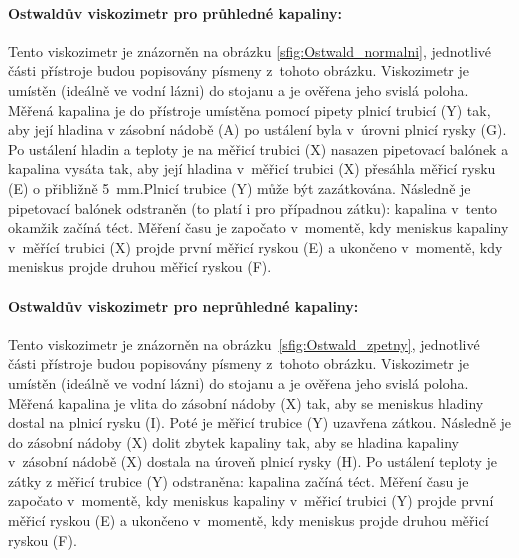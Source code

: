 \documentclass[12pt]{article}
\begin{document}
\paragraph{Ostwaldův viskozimetr pro průhledné kapaliny:}
Tento viskozimetr je znázorněn na obrázku \ref{sfig:Ostwald_normalni}, jednotlivé části přístroje budou popisovány písmeny z~tohoto obrázku. Viskozimetr je umístěn (ideálně ve vodní lázni) do stojanu a je ověřena jeho svislá poloha. Měřená kapalina je do přístroje umístěna pomocí pipety plnicí trubicí (Y) tak, aby její hladina v zásobní nádobě (A) po ustálení byla v~úrovni plnicí rysky (G). Po ustálení hladin a teploty je na měřicí trubici (X) nasazen pipetovací balónek a kapalina vysáta tak, aby její hladina v~měřicí trubici (X) přesáhla měřicí rysku (E) o přibližně \SI{5}{\milli\metre}.\footnotemark Plnicí trubice (Y) může být zazátkována. Následně je pipetovací balónek odstraněn (to platí i pro případnou zátku): kapalina v~tento okamžik začíná téct. Měření času je započato v~momentě, kdy meniskus kapaliny v~měřící trubici (X) projde první měřicí ryskou (E) a ukončeno v~momentě, kdy meniskus projde druhou měřicí ryskou (F).~\cite{book:Calibration_of_viscometers}

\paragraph{Ostwaldův viskozimetr pro neprůhledné kapaliny:}
\label{sec:zpetny_ostwald}
Tento viskozimetr je znázorněn na obrázku~\ref{sfig:Ostwald_zpetny}, jednotlivé části přístroje budou popisovány písmeny z~tohoto obrázku. Viskozimetr je umístěn (ideálně ve vodní lázni) do stojanu a je ověřena jeho svislá poloha. Měřená kapalina je vlita do zásobní nádoby (X) tak, aby se meniskus hladiny dostal na plnicí rysku (I). Poté je měřicí trubice (Y) uzavřena zátkou. Následně je do zásobní nádoby (X) dolit zbytek kapaliny tak, aby se hladina kapaliny v~zásobní nádobě (X) dostala na úroveň plnicí rysky (H). Po ustálení teploty je zátky z měřicí trubice (Y) odstraněna: kapalina začíná téct. Měření času je započato v~momentě, kdy meniskus kapaliny v~měřicí trubici (Y) projde první měřicí ryskou (E) a ukončeno v~momentě, kdy meniskus projde druhou měřicí ryskou (F).~\cite{book:Calibration_of_viscometers}
\end{document}

